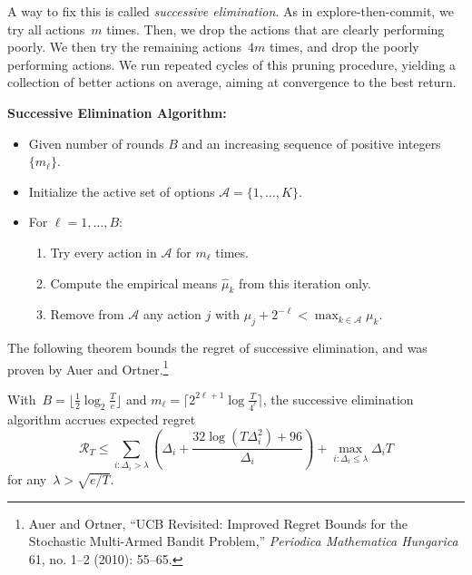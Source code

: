\documentclass{tufte-book}
\begin{document}
A way to fix this is called \emph{successive elimination}. As in
explore-then-commit, we try all actions~\(m\) times. Then, we drop the
actions that are clearly performing poorly. We then try the remaining
actions~\(4m\) times, and drop the poorly performing actions. We run
repeated cycles of this pruning procedure, yielding a collection of
better actions on average, aiming at convergence to the best return.

\begin{Algorithm}

\textbf{Successive Elimination Algorithm:}

\begin{itemize}
\tightlist
\item
  Given number of rounds \(B\) and an increasing sequence of positive
  integers \(\{m_\ell\}\).
\item
  Initialize the active set of options \(\mathcal{A}=\{1,\ldots,K\}\).
\item
  For \(\ell=1,\ldots, B\):

  \begin{enumerate}
  \def\labelenumi{\arabic{enumi}.}
  \tightlist
  \item
    Try every action in \(\mathcal{A}\) for \(m_\ell\) times.
  \item
    Compute the empirical means \(\hat{\mu}_k\) from this iteration
    only.
  \item
    Remove from \(\mathcal{A}\) any action \(j\) with
    \(\mu_j + 2^{-\ell} < \max_{k \in \mathcal{A}} \mu_k\).
  \end{enumerate}
\end{itemize}

\end{Algorithm}

The following theorem bounds the regret of successive elimination, and
was proven by Auer and Ortner.\footnote{Auer and Ortner, {``{UCB}
  Revisited: Improved Regret Bounds for the Stochastic Multi-Armed
  Bandit Problem,''} \emph{Periodica Mathematica Hungarica} 61, no. 1--2
  (2010): 55--65.}

\begin{Theorem}

With~\(B=\lfloor \tfrac{1}{2} \log_2 \tfrac{T}{e} \rfloor\) and
\(m_\ell = \lceil 2^{2\ell+1} \log \tfrac{T} {4^{\ell}} \rceil\), the
successive elimination algorithm accrues expected regret \[
\mathcal{R}_T \leq \sum_{i\colon\Delta_i > \lambda} \left( \Delta_i + \frac{32 \log(T\Delta_i^2) + 96}{\Delta_i} \right) + \max_{i\colon\Delta_i \leq \lambda} \Delta_i T
\] for any~\(\lambda>\sqrt{e/T}\).

\end{Theorem}
\end{document}

